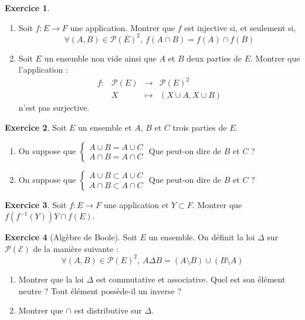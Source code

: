 \documentclass[french]{book}
\newcommand{\inv}{^{-1}}
\theoremstyle{definition}
\newtheorem{ex}{Exercice}[chapter]
\theoremstyle{theorem}
\theoremstyle{remark}
\begin{document}
\begin{ex}
	\begin{enumerate}
		\item Soit $f:E\to F$ une application. Montrer que $f$ est injective si, et seulement si, $$\forall (A,B)\in\mathcal{P}(E)^2,\ f(A\cap B)=f(A)\cap f(B)$$
		\item Soit $E$ un ensemble non vide ainsi que $A$ et $B$ deux parties de $E$. Montrer que l'application : $$\begin{array}{lrcl}
			f:&\mathcal{P}(E)&\longrightarrow&\mathcal{P}(E)^2 \\
			&X&\longmapsto&(X\cup A,X\cup B)
		\end{array}$$ n'est pas surjective.
	\end{enumerate}
\end{ex}

\begin{ex}
	Soit $E$ un ensemble et $A$, $B$ et $C$ trois parties de $E$.
	\begin{enumerate}
		\item On suppose que $\displaystyle\begin{cases}
			A\cup B=A\cup C \\
			A\cap B=A\cap C
		\end{cases}$ Que peut-on dire de $B$ et $C$ ?
		\item On suppose que $\displaystyle\begin{cases}
			A\cup B\subset A\cup C \\
			A\cap B\subset A\cap C
		\end{cases}$ Que peut-on dire de $B$ et $C$ ?
	\end{enumerate}
\end{ex}

\begin{ex}
	Soit $f:E\to F$ une application et $Y\subset F$. Montrer que $f(f\inv(Y))Y\cap f(E)$.
\end{ex}

\begin{ex}[Algèbre de Boole]
	Soit $E$ un ensemble. On définit la loi $\Delta$ sur $\mathcal{P(E)}$ de la manière suivante : $$\forall (A,B)\in\mathcal{P}(E)^2,\ A\Delta B=(A\setminus B)\cup (B\setminus A)$$
	\begin{enumerate}
		\item Montrer que la loi $\Delta$ est commutative et associative. Quel est son élément neutre ? Tout élément possède-il un inverse ?
		\item Montrer que $\cap$ est distributive sur $\Delta$.
	\end{enumerate}
\end{ex}
\end{document}

